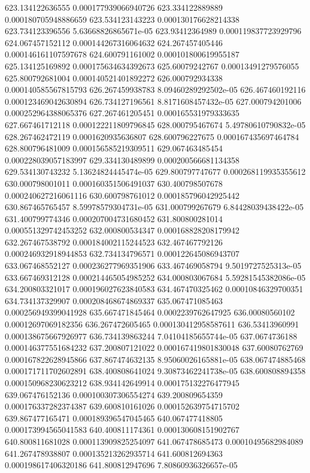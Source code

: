 {623.134122636555 0.000177939066940726
623.334122889889 0.000180705948886659
623.534123143223 0.000130176628214338
623.734123396556 5.63668826865671e-05
623.93412364989 0.000119837723929796
624.067457152112 0.000144267316064632
624.267457405446 0.000146161107597678
624.600791161002 0.000101800619955187
625.134125169892 0.000175634634392673
625.60079242767 0.00013491279576055
625.800792681004 0.000140521401892272
626.000792934338 0.000140585567815793
626.267459938783 8.09460289292502e-05
626.467460192116 0.000123469042630894
626.734127196561 8.8171608457432e-05
627.000794201006 0.000252964388065376
627.267461205451 0.000165531979333635
627.667461712118 0.000122211809796845
628.000795467674 5.49780610790832e-05
628.267462472119 0.0001620935636807
628.600796227675 0.000167435697464784
628.800796481009 0.000156585219309511
629.067463485454 0.000228039057183997
629.334130489899 0.000200566681134358
629.534130743232 5.13624824445474e-05
629.800797747677 0.000268119935355612
630.000798001011 0.000160351506491037
630.400798507678 0.000240627216061116
630.600798761012 0.000185796042925442
630.867465765457 8.59978579304731e-05
631.000799267679 6.84428039438422e-05
631.400799774346 0.000207004731680452
631.800800281014 0.000551329742453252
632.000800534347 0.000168828208179942
632.267467538792 0.000184002115244523
632.467467792126 0.000246932918944853
632.734134796571 0.000122645086943707
633.067468552127 0.000236277969351906
633.467469058794 9.5019727525313e-05
633.667469312128 0.000214465054985252
634.000803067684 5.59281545382086e-05
634.200803321017 0.000196027623840583
634.467470325462 0.00010846329700351
634.734137329907 0.000208468674869337
635.067471085463 0.000256949399041928
635.667471845464 0.0002239762647925
636.00080560102 0.00012697069182356
636.267472605465 0.000130412958587611
636.53413960991 0.000138675667926977
636.734139863244 7.04104185655744e-05
637.0674736188 0.000146377551684232
637.200807121022 0.000167419801830048
637.60080762769 0.000167822628945866
637.867474632135 8.95060026165881e-05
638.067474885468 0.000171711702602891
638.400808641024 9.30873462241738e-05
638.600808894358 0.000150968230623212
638.934142649914 0.000175132276477945
639.067476152136 0.000100307306554274
639.200809654359 0.000176337282374387
639.600810161026 0.000152639754715702
639.867477165471 0.000189396547045465
640.067477418805 0.000173994565041583
640.400811174361 0.000130608151902767
640.800811681028 0.000113909825254097
641.067478685473 0.00010495682984089
641.267478938807 0.000135213262935714
641.600812694363 0.000198617406320186
641.800812947696 7.80860936326657e-05
}
